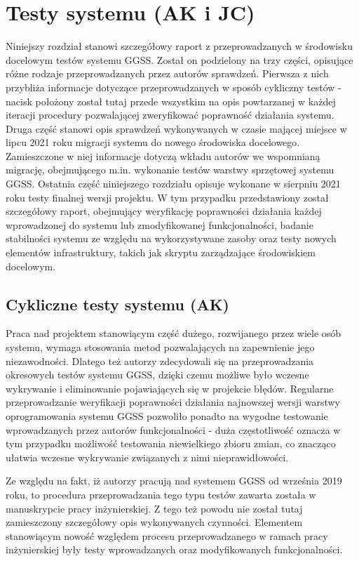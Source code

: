 \chapter{Testy systemu (AK i JC)}
\label{cha:tests}
Niniejszy rozdział stanowi szczegółowy raport z przeprowadzanych w środowisku docelowym testów systemu GGSS. Został on podzielony na trzy części, opisujące różne rodzaje przeprowadzanych przez autorów sprawdzeń. Pierwsza z nich przybliża informacje dotyczące przeprowadzanych w sposób cykliczny testów - nacisk położony został tutaj przede wszystkim na opis powtarzanej w każdej iteracji procedury pozwalającej zweryfikować poprawność działania systemu. Druga część stanowi opis sprawdzeń wykonywanych w czasie mającej miejsce w lipcu 2021 roku migracji systemu do nowego środowiska docelowego. Zamieszczone w niej informacje dotyczą wkładu autorów we wspomnianą migrację, obejmującego m.in. wykonanie testów warstwy sprzętowej systemu GGSS. Ostatnia część niniejszego rozdziału opisuje wykonane w sierpniu 2021 roku testy finalnej wersji projektu. W tym przypadku przedstawiony został szczegółowy raport, obejmujący weryfikację poprawności działania każdej wprowadzonej do systemu lub zmodyfikowanej funkcjonalności, badanie stabilności systemu ze względu na wykorzystywane zasoby oraz testy nowych elementów infrastruktury, takich jak skryptu zarządzające środowiskiem docelowym.

\section{Cykliczne testy systemu (AK)}
Praca nad projektem stanowiącym część dużego, rozwijanego przez wiele osób systemu, wymaga stosowania metod pozwalających na zapewnienie jego niezawodności. Dlatego też autorzy zdecydowali się na przeprowadzania okresowych testów systemu GGSS, dzięki czemu możliwe było wczesne wykrywanie i eliminowanie pojawiających się w projekcie błędów. Regularne przeprowadzanie weryfikacji poprawności działania najnowszej wersji warstwy oprogramowania systemu GGSS pozwoliło ponadto na wygodne testowanie wprowadzanych przez autorów funkcjonalności - duża częstotliwość oznacza w tym przypadku możliwość testowania niewielkiego zbioru zmian, co znacząco ułatwia wczesne wykrywanie związanych z nimi nieprawidłowości.

Ze względu na fakt, iż autorzy pracują nad systemem GGSS od września 2019 roku, to procedura przeprowadzania tego typu testów zawarta została w manuskrypcie pracy inżynierskiej. Z tego też powodu nie został tutaj zamieszczony szczegółowy opis wykonywanych czynności. Elementem stanowiącym nowość względem procesu przeprowadzanego w ramach pracy inżynierskiej były testy wprowadzanych oraz modyfikowanych funkcjonalności.



